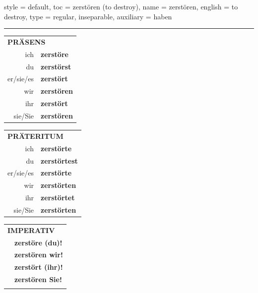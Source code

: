 \begin{verbentry}{
  style = {default},
  toc = {zerstören (to destroy)},
  name = {zerstören},
  english = {to destroy},
  type = {regular, inseparable},
  auxiliary = {haben}
}
 
    
     \vspace{5pt}

    \hrule
    
    \vspace{5pt}

  \begin{tabular}{rl}
     \multicolumn{2}{l}{\textbf{PRÄSENS} }\\
    ich & \textbf{zerstöre}\\
    du & \textbf{zerstörst}\\
    er/sie/es & \textbf{zerstört}\\
    wir & \textbf{zerstören}\\
    ihr & \textbf{zerstört}\\
    sie/Sie & \textbf{zerstören}\\
  \end{tabular}
  \hfill
     \begin{tabular}{rl}
    \multicolumn{2}{l}{\textbf{PRÄTERITUM} }\\
    ich & \textbf{zerstörte}\\
    du & \textbf{zerstörtest}\\
    er/sie/es & \textbf{zerstörte}\\
    wir & \textbf{zerstörten}\\
    ihr & \textbf{zerstörtet}\\
    sie/Sie & \textbf{zerstörten}\\
  \end{tabular}
  \hfill
  \begin{tabular}{rl}
     \multicolumn{2}{l}{\textbf{IMPERATIV} }\\
   & \textbf{zerstöre (du)!}\\
   & \textbf{zerstören wir!}\\
   & \textbf{zerstört (ihr)!}\\
   & \textbf{zerstören Sie!}\\
   & \vspace{10pt}
  \end{tabular}

    \vspace{10pt}


\end{verbentry}
